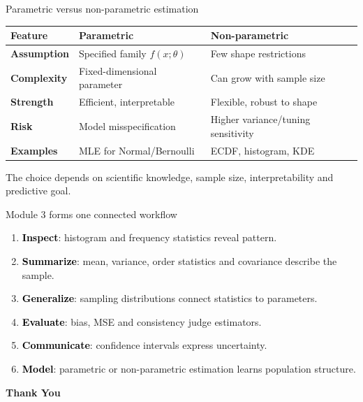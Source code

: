 \documentclass[aspectratio=169,11pt]{beamer}
\newcommand{\key}[1]{\textcolor{black}{\textbf{#1}}}
\begin{document}
\begin{frame}{Parametric versus non-parametric estimation}
\begin{center}
\begin{tabular}{>{\bfseries}p{2.8cm}p{4.4cm}p{4.4cm}}
\toprule
Feature & Parametric & Non-parametric\\
\midrule
Assumption & Specified family $f(x;\theta)$ & Few shape restrictions\\
Complexity & Fixed-dimensional parameter & Can grow with sample size\\
Strength & Efficient, interpretable & Flexible, robust to shape\\
Risk & Model misspecification & Higher variance/tuning sensitivity\\
Examples & MLE for Normal/Bernoulli & ECDF, histogram, KDE\\
\bottomrule
\end{tabular}
\end{center}
The choice depends on scientific knowledge, sample size, interpretability and predictive goal.
\end{frame}

\begin{frame}{Module 3 forms one connected workflow}
\begin{enumerate}
  \item \key{Inspect}: histogram and frequency statistics reveal pattern.
  \item \key{Summarize}: mean, variance, order statistics and covariance describe the sample.
  \item \key{Generalize}: sampling distributions connect statistics to parameters.
  \item \key{Evaluate}: bias, MSE and consistency judge estimators.
  \item \key{Communicate}: confidence intervals express uncertainty.
  \item \key{Model}: parametric or non-parametric estimation learns population structure.
\end{enumerate}
\end{frame}




\begin{frame}[plain]
\begin{center}
{\Huge\color{navy}\textbf{Thank You}}\\[1em]
\end{center}
\end{frame}
\end{document}
